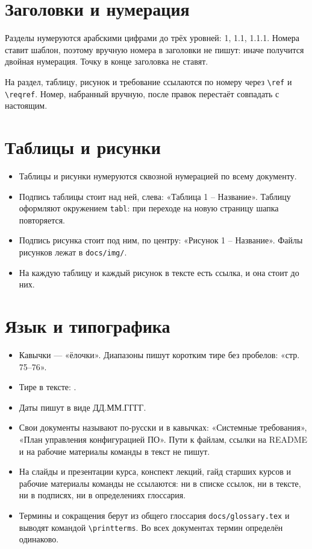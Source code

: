 \documentclass{tpks}
\begin{document}
\section{Заголовки и нумерация}

Разделы нумеруются арабскими цифрами до трёх уровней: 1, 1.1, 1.1.1. Номера ставит шаблон, поэтому вручную номера в заголовки не пишут: иначе получится двойная нумерация. Точку в конце заголовка не ставят.

На раздел, таблицу, рисунок и требование ссылаются по номеру через \texttt{\textbackslash ref} и \texttt{\textbackslash reqref}. Номер, набранный вручную, после правок перестаёт совпадать с настоящим.

\section{Таблицы и рисунки}

\begin{itemize}
  \item Таблицы и рисунки нумеруются сквозной нумерацией по всему документу.
  \item Подпись таблицы стоит над ней, слева: «Таблица 1 – Название». Таблицу оформляют окружением \texttt{tabl}: при переходе на новую страницу шапка повторяется.
  \item Подпись рисунка стоит под ним, по центру: «Рисунок 1 – Название». Файлы рисунков лежат в \texttt{docs/img/}.
  \item На каждую таблицу и каждый рисунок в тексте есть ссылка, и она стоит до них.
\end{itemize}

\section{Язык и типографика}

\begin{itemize}
  \item Кавычки — «ёлочки». Диапазоны пишут коротким тире без пробелов: «стр. 75--76».
  \item Тире в тексте: .
  \item Даты пишут в виде ДД.ММ.ГГГГ.
  \item Свои документы называют по-русски и в кавычках: «Системные требования», «План управления конфигурацией ПО». Пути к файлам, ссылки на README и на рабочие материалы команды в текст не пишут.
  \item На слайды и презентации курса, конспект лекций, гайд старших курсов и рабочие материалы команды не ссылаются: ни в списке ссылок, ни в тексте, ни в подписях, ни в определениях глоссария.
  \item Термины и сокращения берут из общего глоссария \texttt{docs/glossary.tex} и выводят командой \texttt{\textbackslash printterms}. Во всех документах термин определён одинаково.
\end{itemize}
\end{document}

